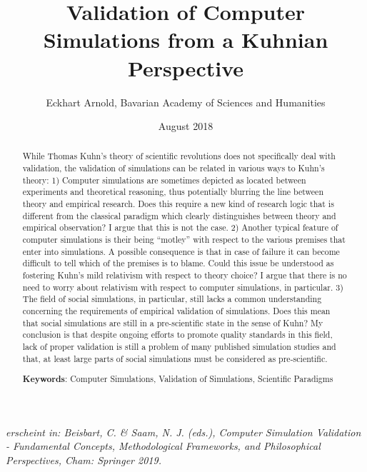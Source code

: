 \documentclass[12pt, a4paper]{article}
\begin{document}
\title{Validation of Computer Simulations from a Kuhnian Perspective}

\author{Eckhart Arnold, Bavarian Academy of Sciences and Humanities}

\date{August 2018}

\maketitle

\sloppy

\begin{center}
{\em erscheint in: Beisbart, C. \& Saam, N. J. (eds.), Computer
Simulation Validation  - Fundamental Concepts, Methodological
Frameworks, and Philosophical Perspectives, Cham: Springer 2019.}
\end{center}

\begin{abstract}
\singlespacing

While Thomas Kuhn's theory of scientific revolutions does not
specifically deal with validation, the validation of simulations can
be related in various ways to Kuhn's theory: 1) Computer simulations
are sometimes depicted as located between experiments and theoretical
reasoning, thus potentially blurring the line between theory and
empirical research. Does this require a new kind of research logic
that is different from the classical paradigm which clearly
distinguishes between theory and empirical observation? I argue that
this is not the case. 2) Another typical feature of computer
simulations is their being ``motley'' \citep{winsberg:2003} with
respect to the various premises that enter into simulations. A
possible consequence is that in case of failure it can become
difficult to tell which of the premises is to blame. Could this issue
be understood as fostering Kuhn's mild relativism with respect to
theory choice? I argue that there is no need to worry about relativism
with respect to computer simulations, in particular. 3) The field of
social simulations, in particular, still lacks a common understanding
concerning the requirements of empirical validation of simulations.
Does this mean that social simulations are still in a pre-scientific
state in the sense of Kuhn? My conclusion is that despite ongoing
efforts to promote quality standards in this field, lack of proper
validation is still a problem of many published simulation studies and
that, at least large parts of social simulations must be considered as
pre-scientific.


\begin{flushleft}
  {\bf Keywords}: Computer Simulations, Validation of Simulations,
  Scientific Paradigms
\end{flushleft}

\end{abstract}
\end{document}

